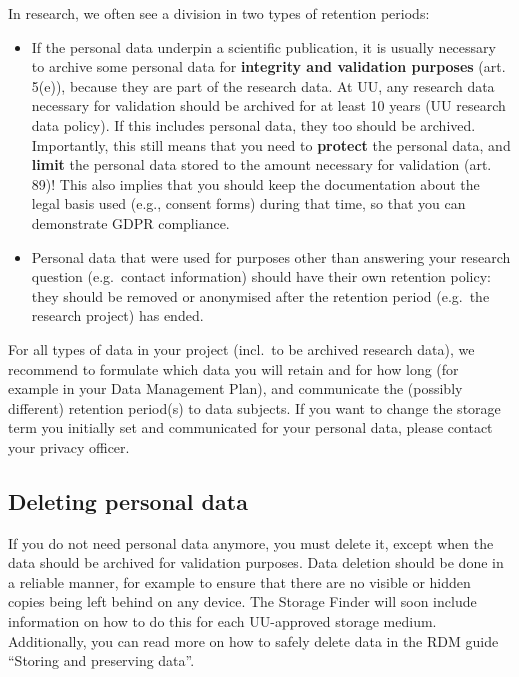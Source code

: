 \documentclass[
]{book}
\providecommand{\tightlist}{%
  \setlength{\itemsep}{0pt}\setlength{\parskip}{0pt}}
\begin{document}
In research, we often see a division in two types of retention periods:

\begin{itemize}
\tightlist
\item
  If the personal data underpin a scientific publication, it is usually necessary
  to archive some personal data for \textbf{integrity and validation purposes}
  (art. 5(e)),
  because they are part of the research data. At UU, any research data necessary
  for validation should be archived for at least 10 years
  (UU research data policy).
  If this includes personal data, they too should be archived. Importantly, this
  still means that you need to \textbf{protect} the personal data, and \textbf{limit} the personal
  data stored to the amount necessary for validation
  (art. 89)!
  This also implies that you should keep the documentation about the legal basis
  used (e.g., consent forms) during that time, so that you can demonstrate GDPR
  compliance.
\item
  Personal data that were used for purposes other than answering your
  research question (e.g.~contact information) should have their own retention
  policy: they should be removed or anonymised after the retention period
  (e.g.~the research project) has ended.
\end{itemize}

For all types of data in your project (incl.~to be archived research data), we
recommend to formulate which data you will retain and for how long (for example
in your Data Management Plan), and communicate the (possibly different)
retention period(s) to data subjects. If you want to change the storage term you
initially set and communicated for your personal data, please contact your
privacy officer.

\hypertarget{deleting-personal-data}{%
\subsection{Deleting personal data}\label{deleting-personal-data}}

If you do not need personal data anymore, you must delete it, except when the data
should be archived for validation purposes. Data deletion should be done in a
reliable manner, for example to ensure that there are no visible or hidden copies
being left behind on any device. The Storage Finder will soon include information on how to do
this for each UU-approved storage medium. Additionally, you can read more on
how to safely delete data in the RDM guide ``Storing and preserving data''.
\end{document}
